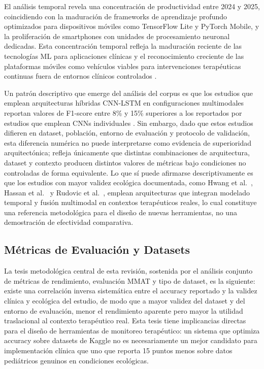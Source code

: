 \documentclass[ASNA,twocolumn]{USG}
\begin{document}
	El análisis temporal revela una concentración de productividad entre 2024 y 2025,
	coincidiendo con la maduración de frameworks de aprendizaje profundo optimizados
	para dispositivos móviles como TensorFlow Lite y PyTorch Mobile, y la proliferación
	de smartphones con unidades de procesamiento neuronal dedicadas. Esta concentración
	temporal refleja la maduración reciente de las tecnologías ML para aplicaciones
	clínicas y el reconocimiento creciente de las plataformas móviles como vehículos
	viables para intervenciones terapéuticas continuas fuera de entornos clínicos
	controlados \cite{Levy2024}.
	
	Un patrón descriptivo que emerge del análisis del corpus es que los estudios que
	emplean arquitecturas híbridas CNN-LSTM en configuraciones multimodales reportan
	valores de F1-score entre 8\% y 15\% superiores a los reportados por estudios que
	emplean CNNs individuales \cite{Rudovic2019,Rhatassi2025}. Sin embargo, dado que
	estos estudios difieren en dataset, población, entorno de evaluación y protocolo
	de validación, esta diferencia numérica no puede interpretarse como evidencia de
	superioridad arquitectónica; refleja únicamente que distintas combinaciones de
	arquitectura, dataset y contexto producen distintos valores de métricas bajo
	condiciones no controladas de forma equivalente. Lo que sí puede afirmarse
	descriptivamente es que los estudios con mayor validez ecológica documentada, como
	Hwang et al.\ \cite{Hwang2024}, Hassan et al.\ \cite{Hassan2025} y Rudovic et al.\
	\cite{Rudovic2019}, emplean arquitecturas que integran modelado temporal y fusión
	multimodal en contextos terapéuticos reales, lo cual constituye una referencia
	metodológica para el diseño de nuevas herramientas, no una demostración de
	efectividad comparativa.
	
	\subsection{Métricas de Evaluación y Datasets}\label{sec6b}
	
	La tesis metodológica central de esta revisión, sostenida por el análisis conjunto
	de métricas de rendimiento, evaluación MMAT y tipo de dataset, es la siguiente:
	existe una correlación inversa sistemática entre el accuracy reportado y la validez
	clínica y ecológica del estudio, de modo que a mayor validez del dataset y del
	entorno de evaluación, menor el rendimiento aparente pero mayor la utilidad
	traslacional al contexto terapéutico real. Esta tesis tiene implicancias directas
	para el diseño de herramientas de monitoreo terapéutico: un sistema que optimiza
	accuracy sobre datasets de Kaggle no es necesariamente un mejor candidato para
	implementación clínica que uno que reporta 15 puntos menos sobre datos pediátricos
	genuinos en condiciones ecológicas.
	
\end{document}
